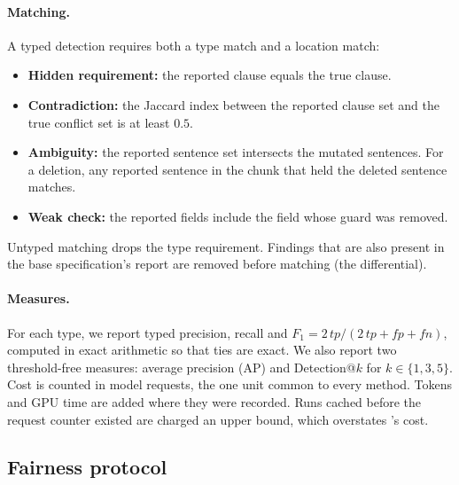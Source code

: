 \paragraph{Matching.} A typed detection requires both a type match and a location match:
\begin{itemize}[leftmargin=*]
\item \textbf{Hidden requirement:} the reported clause equals the true clause.
\item \textbf{Contradiction:} the Jaccard index between the reported clause set and the true conflict set is at least $0.5$.
\item \textbf{Ambiguity:} the reported sentence set intersects the mutated sentences. For a deletion, any reported sentence in the chunk that held the deleted sentence matches.
\item \textbf{Weak check:} the reported fields include the field whose guard was removed.
\end{itemize}
Untyped matching drops the type requirement. Findings that are also present in the base specification's report are removed before matching (the differential).

\paragraph{Measures.} For each type, we report typed precision, recall and $F_1=2\,\textit{tp}/(2\,\textit{tp}+\textit{fp}+\textit{fn})$, computed in exact arithmetic so that ties are exact. We also report two threshold-free measures: average precision (AP) and Detection@$k$ for $k\in\{1,3,5\}$. Cost is counted in model requests, the one unit common to every method. Tokens and GPU time are added where they were recorded. Runs cached before the request counter existed are charged an upper bound, which overstates \specdx's cost.

\subsection{Fairness protocol}
\label{sec:eval-fairness}

